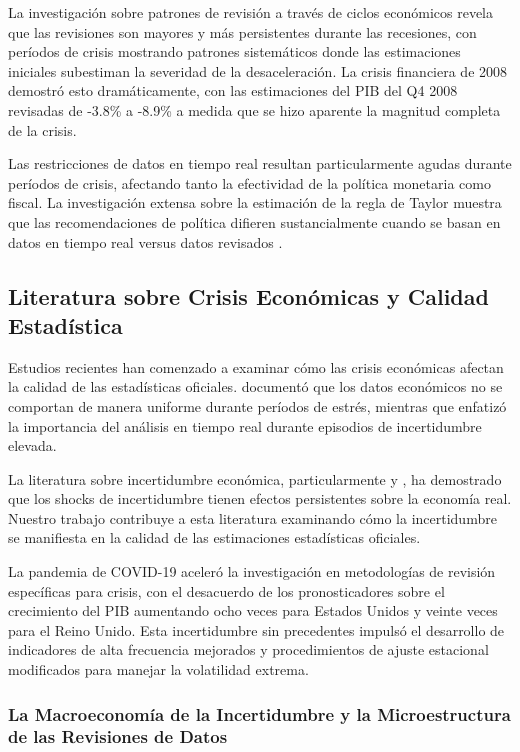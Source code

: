 \documentclass{article}
\begin{document}
La investigación sobre patrones de revisión a través de ciclos económicos revela que las revisiones son mayores y más persistentes durante las recesiones, con períodos de crisis mostrando patrones sistemáticos donde las estimaciones iniciales subestiman la severidad de la desaceleración. La crisis financiera de 2008 demostró esto dramáticamente, con las estimaciones del PIB del Q4 2008 revisadas de -3.8\% a -8.9\% a medida que se hizo aparente la magnitud completa de la crisis.

Las restricciones de datos en tiempo real resultan particularmente agudas durante períodos de crisis, afectando tanto la efectividad de la política monetaria como fiscal. La investigación extensa sobre la estimación de la regla de Taylor muestra que las recomendaciones de política difieren sustancialmente cuando se basan en datos en tiempo real versus datos revisados \citep{orphanides2001}.

\subsection{Literatura sobre Crisis Económicas y Calidad Estadística}

Estudios recientes han comenzado a examinar cómo las crisis económicas afectan la calidad de las estadísticas oficiales. \citet{aruoba2008} documentó que los datos económicos no se comportan de manera uniforme durante períodos de estrés, mientras que \citet{croushore2011} enfatizó la importancia del análisis en tiempo real durante episodios de incertidumbre elevada.

La literatura sobre incertidumbre económica, particularmente \citet{bloom2009} y \citet{baker2016}, ha demostrado que los shocks de incertidumbre tienen efectos persistentes sobre la economía real. Nuestro trabajo contribuye a esta literatura examinando cómo la incertidumbre se manifiesta en la calidad de las estimaciones estadísticas oficiales.

La pandemia de COVID-19 aceleró la investigación en metodologías de revisión específicas para crisis, con el desacuerdo de los pronosticadores sobre el crecimiento del PIB aumentando ocho veces para Estados Unidos y veinte veces para el Reino Unido. Esta incertidumbre sin precedentes impulsó el desarrollo de indicadores de alta frecuencia mejorados y procedimientos de ajuste estacional modificados para manejar la volatilidad extrema.

\subsubsection{La Macroeconomía de la Incertidumbre y la Microestructura de las Revisiones de Datos}
\end{document}
